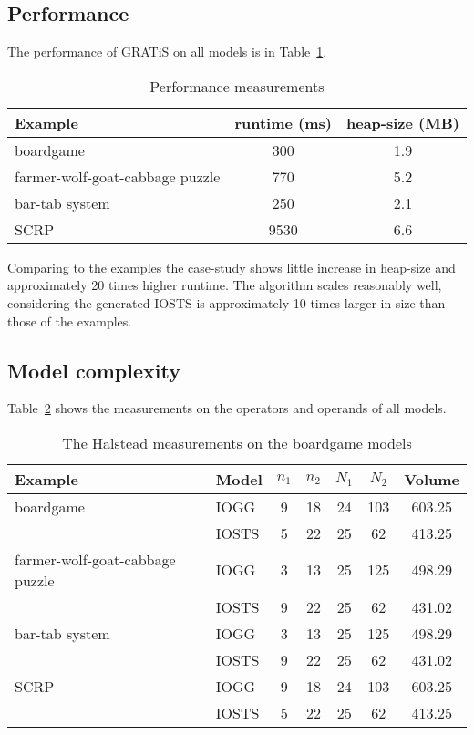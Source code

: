 
\subsection{Performance}
The performance of GRATiS on all models is in Table~\ref{tab:performance}.

\begin{table}[ht]
\begin{center}
\begin{tabular}{|l|c|c|}
\hline
\textbf{Example} & \textbf{runtime (ms)} & \textbf{heap-size (MB)} \\ \hline
boardgame & 300 & 1.9 \\ \hline
farmer-wolf-goat-cabbage puzzle & 770 & 5.2 \\ \hline
bar-tab system & 250 & 2.1 \\ \hline
SCRP & 9530 & 6.6 \\ \hline
\end{tabular}
\end{center}
\caption{Performance measurements}
\label{tab:performance}
\end{table}

Comparing to the examples the case-study shows little increase in heap-size and approximately 20 times higher runtime. The algorithm scales reasonably well, considering the generated IOSTS is approximately 10 times larger in size than those of the examples.

\subsection{Model complexity}
Table~\ref{tab:halstead} shows the measurements on the operators and operands of all models.

\begin{table}[ht]
\begin{center}
\begin{tabular}{| l | l | c | c | c | c | c |}
  \hline
  \textbf{Example} & \textbf{Model} & $n_1$ & $n_2$ & $N_1$ & $N_2$ & Volume \\ \hline
  boardgame & IOGG & 9 & 18 & 24 & 103 & 603.25 \\
  & IOSTS & 5 & 22 & 25 & 62 & 413.25 \\ \hline
  farmer-wolf-goat-cabbage puzzle & IOGG & 3 & 13 & 25 & 125 & 498.29 \\ 
  & IOSTS & 9 & 22 & 25 & 62 & 431.02 \\ \hline
  bar-tab system & IOGG & 3 & 13 & 25 & 125 & 498.29 \\
  & IOSTS & 9 & 22 & 25 & 62 & 431.02 \\ \hline
  SCRP & IOGG & 9 & 18 & 24 & 103 & 603.25 \\ 
  & IOSTS & 5 & 22 & 25 & 62 & 413.25 \\
  \hline
\end{tabular}
\end{center}
\caption{The Halstead measurements on the boardgame models}
\label{tab:halstead}
\end{table}

